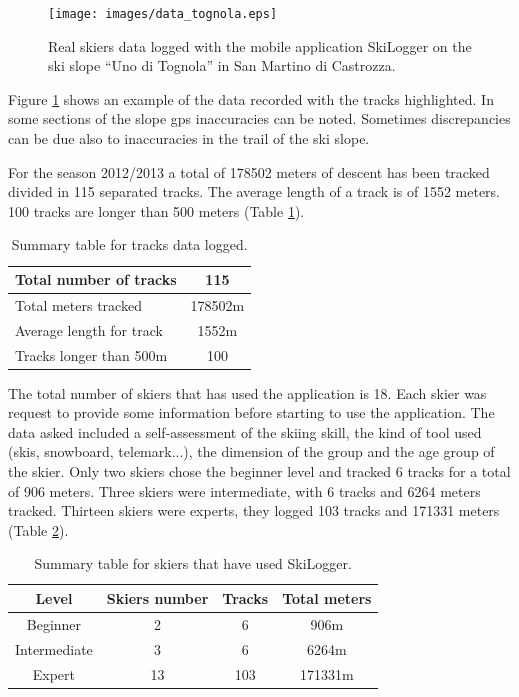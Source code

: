 \documentclass[12pt,a4paper,twoside]{book}
\begin{document}
\begin{figure}[!h]
  \begin{center}
    \texttt{[image: images/data\_tognola.eps]}
    \caption{Real skiers data logged with the mobile application SkiLogger on the ski slope ``Uno di Tognola'' in San Martino di Castrozza.}\label{data_tognola}
  \end{center}
\end{figure}

Figure \ref{data_tognola} shows an example of the data recorded with the tracks highlighted. In some sections of the slope gps inaccuracies can be noted. Sometimes discrepancies can be due also to inaccuracies in the trail of the ski slope.

For the season 2012/2013 a total of 178502 meters of descent has been tracked divided in 115 separated tracks. The average length of a track is of 1552 meters. 100 tracks are longer than 500 meters (Table \ref{descendts}).

\begin{table}[!h]
  \centering
  \begin{tabular}{ | l | c | }
    \hline
    Total number of tracks & 115 \\ \hline
    Total meters tracked & 178502m \\ \hline
    Average length for track & 1552m \\ \hline
    Tracks longer than 500m & 100 \\
    \hline
  \end{tabular}
  \caption{Summary table for tracks data logged.}
  \label{descendts}
\end{table}

The total number of skiers that has used the application is 18. Each skier was request to provide some information before starting to use the application. The data asked included a self-assessment of the skiing skill, the kind of tool used (skis, snowboard, telemark...), the dimension of the group and the age group of the skier. Only two skiers chose the beginner level and tracked 6 tracks for a total of 906 meters. Three skiers were intermediate, with 6 tracks and 6264 meters tracked. Thirteen skiers were experts, they logged 103 tracks and 171331 meters (Table \ref{skiers}).

\begin{table}[!h]
  \centering
  \begin{tabular}{ | c | c | c | c | }
    \hline
    Level & Skiers number & Tracks & Total meters \\
    \hline
    Beginner & 2  & 6 & 906m \\
    Intermediate & 3 & 6 & 6264m \\
    Expert & 13 & 103 & 171331m \\
    \hline
  \end{tabular}
  \caption{Summary table for skiers that have used SkiLogger.}
  \label{skiers}
\end{table}
\end{document}
